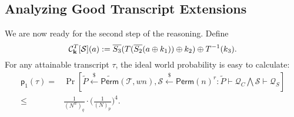 \subsection{Analyzing Good Transcript Extensions}
\label{sec:good-tau-4-rounds}

We are now ready for the second step of the reasoning. Define
%
$$\mathcal{C}_{\mathbf{k}}^T[\mathcal{S}](a):=   \overline{S_3}(T(\overline{S_2}(a\oplus k_1))\oplus k_2)\oplus T^{-1}(k_3).$$
%
For any attainable transcript $\tau$, the ideal world probability is easy to calculate:
%
%
\begin{align*}
\mathsf{p}_{1}(\tau)=&\operatorname{Pr}\left[\widetilde{P} \stackrel{\$}{\leftarrow} \widetilde{{\mathsf{Perm}}}(\mathcal{T}, w n), \mathcal{S} \stackrel{\$}{\leftarrow} \mathsf{Perm}(n)^{r}: \widetilde{P} \vdash \mathcal{Q}_{C} \bigwedge \mathcal{S} \vdash \mathcal{Q}_{S}\right]		\\
\leq&\frac{1}{(N^w)_q}\cdot\bigg(\frac{1}{(N)_p}\bigg)^4.
\end{align*}




